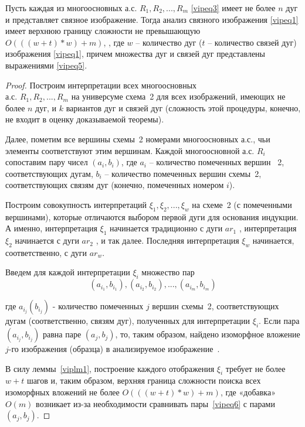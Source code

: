 \begin{theorem}
Пусть каждая из многоосновных а.с. $R_1, R_2, ..., R_m$  \ref{vipeq3} имеет не  более   $n$   дуг и представляет связное изображение. Тогда анализ  связного изображения \ref{vipeq1} имеет верхнюю границу сложности не превышающую $O(((w + t)*w) + m)$,  , где  $w$ -- количество дуг ($t$ -- количество связей дуг) изображения \ref{vipeq1}, причем множества дуг и связей дуг представлены выражениями \ref{vipeq5}.
\label{main_theorem_1}
\end{theorem}
\begin{proof}
Построим интерпретации всех многоосновных\\а.с. $R_1, R_2, ..., R_m$  на универсуме  схема~2 для всех изображений, имеющих не более  $n$ дуг, и  $k$ вариантов дуг и связей дуг (сложность этой процедуры, конечно, не входит в оценку доказываемой теоремы).

Далее, пометим все вершины схемы~2 номерами многоосновных а.с., чьи элементы соответствуют этим вершинам. Каждой многоосновной а.с. $R_i$ сопоставим пару чисел $(a_i, b_i)$, где  $a_i$ – количество помеченных вершин ~2, соответствующих дугам, $b_i$ – количество помеченных вершин схемы~2, соответствующих связям дуг (конечно, помеченных номером $i$).

Построим совокупность интерпретаций $\xi_1, \xi_2, ..., \xi_w$  на  схеме~2 (с помеченными вершинами), которые отличаются выбором первой дуги для основания индукции. А именно, интерпретация $\xi_1$ начинается традиционно с дуги $ar_1$ ,  интерпретация $\xi_2$  начинается с дуги $ar_2$ ,  и так далее. Последняя интерпретация  $\xi_w$ начинается, соответственно, с дуги $ar_w$.

Введем для каждой интерпретации  $\xi_i$     множество пар  
\begin{equation}
(a_{i_1} , b_{i_1} ), (a_{i_2} , b_{i_2} ), ..., (a_{i_m} , b_{i_m} )
\label{vipeq6}
\end{equation}

где  $a_{i_j}(b_{i_j})$  - количество помеченных $j$ вершин схемы~2, соответствующих дугам (соответственно, связям дуг), полученных для интерпретации $\xi_i$. Если пара $(a_{i_j}  ,b_{i_j})$  равна паре  $(a_j, b_j)$, то, таким образом, найдено изоморфное вложение $j$-го изображения (образца)  в анализируемое изображение~\label{vipqe1}.

В силу леммы~\ref{viplm1}, построение каждого отображения $\xi_i$  требует не более  $w + t$ шагов и, таким образом, верхняя граница сложности  поиска всех изоморфных вложений не более  $O(((w + t)*w) + m)$, где «добавка» $O(m)$ возникает из-за необходимости сравнивать пары~\ref{vipeq6} с парами  $(a_j, b_j)$.
\end{proof}


